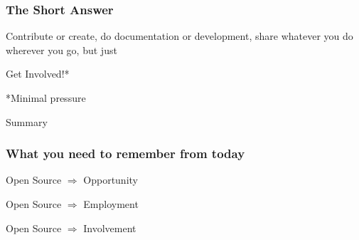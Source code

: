 \documentclass{beamer}
\begin{document}
\begin{frame}
  \frametitle{The Short Answer}
  \begin{center}
    \begin{Large}
      \textcolor{beamer@myblue}{Contribute} or \textcolor{beamer@myblue}{create}, do \textcolor{beamer@mygreen}{documentation} or \textcolor{beamer@mygreen}{development}, \textcolor{beamer@mygrey}{share} whatever you do wherever you go, but just
    \end{Large}

    \vspace{3em}

    \begin{Huge}
      Get Involved!*
    \end{Huge}
  \end{center}

\vspace{7em}

\begin{footnotesize}
  *Minimal pressure
\end{footnotesize}

\end{frame}

\begin{frame}
  \begin{center}
    \begin{Huge}Summary\end{Huge}
  \end{center}
\end{frame}

\begin{frame}
  \frametitle{What you need to remember from today}
  \begin{center}
    \begin{Huge}
      Open Source $\Rightarrow$ Opportunity

      \vspace{1em}

      Open Source $\Rightarrow$ Employment

      \vspace{1em}
      
      Open Source $\Rightarrow$ Involvement
    \end{Huge}
  \end{center}
\end{frame}

\end{document}
